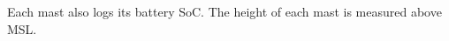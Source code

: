 \documentclass{article}
\begin{document}
Each mast also logs its battery SoC.
The height of each mast is measured above MSL.
\end{document}
